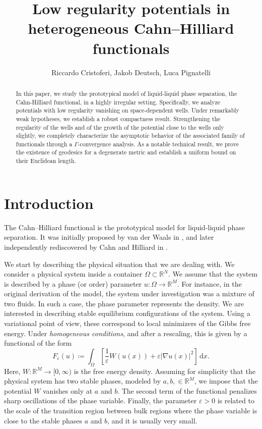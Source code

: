 \documentclass[a4paper, 11pt, reqno]{amsart}
\title[Low Regularity Potentials]{Low regularity potentials in heterogeneous Cahn--Hilliard functionals}
\author{Riccardo Cristoferi, Jakob Deutsch, Luca Pignatelli}
\theoremstyle{plain}
\theoremstyle{definition}
\theoremstyle{remark}
\newcommand{\R}{\mathbb R}
\newcommand{\dd}{\,\mathrm{d}}
\renewcommand{\o}{\Omega}
\begin{document}
\begin{abstract}
In this paper, we study the prototypical model of liquid-liquid phase separation, the Cahn-Hilliard functional, in a highly irregular setting.
    Specifically, we analyze potentials with low regularity vanishing on space-dependent wells.
    Under remarkably weak hypotheses, we establish a robust compactness result.
    Strengthening the regularity of the wells and of the growth of the potential close to the wells only slightly, we completely characterize the asymptotic behavior of the associated family of functionals through a $\Gamma$-convergence analysis.
    As a notable technical result, we prove the existence of geodesics for a degenerate metric and establish a uniform bound on their Euclidean length.
\end{abstract}

\maketitle


\tableofcontents


\section{Introduction}

The Cahn--Hilliard functional is the prototypical model for liquid-liquid phase separation.
It was initially proposed by van der Waals in \cite{vanDW}, and later independently rediscovered by Cahn and Hilliard in \cite{CH}.

We start by describing the physical situation that we are dealing with.
We consider a physical system inside a container $\o \subset \R^N$.
We assume that the system is described by a phase (or order) parameter $u \colon \o \to \R^M$.
For instance, in the original derivation of the model, the system under investigation was a mixture of two fluids. In such a case, the phase parameter represents the density.
We are interested in describing stable equilibrium configurations of the system.
Using a variational point of view, these correspond to local minimizers of the Gibbs free energy.
Under \emph{homogeneous conditions}, and after a rescaling, this is given by a functional of the form
\[
F_\varepsilon(u) \coloneqq \int_\Omega \left[ \frac{1}{\varepsilon}W(u(x)) + \varepsilon|\nabla u(x)|^2 \right] \dd x.
\]
Here, $W\colon \R^M\to[0,\infty)$ is the free energy density.
Assuming for simplicity that the physical system has two stable phases, modeled by $a,b,\in\R^M$, we impose that the potential $W$ vanishes only at $a$ and $b$.
The second term of the functional penalizes sharp oscillations of the phase variable.
Finally, the parameter $\varepsilon>0$ is related to the scale of the transition region between bulk regions where the phase variable is close to the stable phases $a$ and $b$, and it is usually very small.
\end{document}

